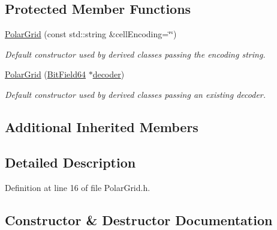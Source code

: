 \subsection*{Protected Member Functions}
\begin{DoxyCompactItemize}
\item 
\hyperlink{class_d_d4hep_1_1_d_d_segmentation_1_1_polar_grid_ac8fe161b5a7730ac7bf6f3a3a45f70a6}{Polar\+Grid} (const std\+::string \&cell\+Encoding=\char`\"{}\char`\"{})
\begin{DoxyCompactList}\small\item\em Default constructor used by derived classes passing the encoding string. \end{DoxyCompactList}\item 
\hyperlink{class_d_d4hep_1_1_d_d_segmentation_1_1_polar_grid_a292c46648971f17f21fa556425d1fd66}{Polar\+Grid} (\hyperlink{class_d_d4hep_1_1_d_d_segmentation_1_1_bit_field64}{Bit\+Field64} $\ast$\hyperlink{class_d_d4hep_1_1_d_d_segmentation_1_1_segmentation_abec3489982d0fe91ef4b142d9d755576}{decoder})
\begin{DoxyCompactList}\small\item\em Default constructor used by derived classes passing an existing decoder. \end{DoxyCompactList}\end{DoxyCompactItemize}
\subsection*{Additional Inherited Members}


\subsection{Detailed Description}


Definition at line 16 of file Polar\+Grid.\+h.



\subsection{Constructor \& Destructor Documentation}
\hypertarget{class_d_d4hep_1_1_d_d_segmentation_1_1_polar_grid_a894846ac7aeb9478a22e7bb0687178d8}{}\label{class_d_d4hep_1_1_d_d_segmentation_1_1_polar_grid_a894846ac7aeb9478a22e7bb0687178d8} 
